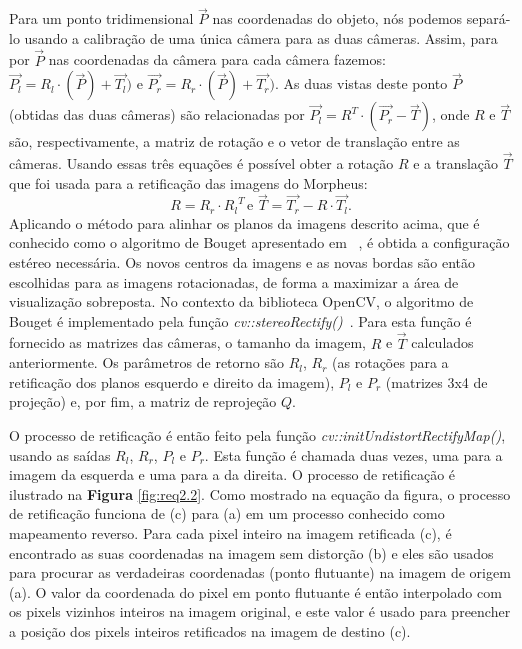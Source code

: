\documentclass{bmvc2k}
\begin{document}
Para um ponto tridimensional $\overrightarrow{P}$ nas coordenadas do objeto, nós podemos separá-lo usando a calibração de uma única câmera para as duas câmeras. Assim, para por $\overrightarrow{P}$ nas coordenadas da câmera para cada câmera fazemos: $\overrightarrow{P_l} = {R_l} \cdot (\overrightarrow{P}) + \overrightarrow{T_l})$ e $\overrightarrow{P_r} = {R_r} \cdot (\overrightarrow{P}) + \overrightarrow{T_r})$.
As duas vistas deste ponto $\overrightarrow{P}$ (obtidas das duas câmeras) são relacionadas por $\overrightarrow{P_l} = {R^T} \cdot (\overrightarrow{P_r} - \overrightarrow{T} )$, onde $R$ e $\overrightarrow{T}$ são, respectivamente, a matriz de rotação e o vetor de translação entre as câmeras. Usando essas três equações é possível obter a rotação $R$ e a translação $\overrightarrow{T}$ que foi usada para a retificação das imagens do Morpheus: $$R = R_r \cdot {R_l}^T \, \mbox{e } \overrightarrow{T} = \overrightarrow{T_r} - R \cdot \overrightarrow{T_l}.$$
Aplicando o método para alinhar os planos da imagens descrito acima, que é conhecido como o algoritmo de Bouget apresentado em ~\cite{kaehler2016learning}, é obtida a configuração estéreo necessária. Os novos centros da imagens e as novas bordas são então escolhidas para as imagens rotacionadas, de forma a maximizar a área de visualização sobreposta. No contexto da biblioteca OpenCV, o algoritmo de Bouget é implementado pela função \textit{cv::stereoRectify()}~\cite{opencvmanual}. Para esta função é fornecido as matrizes das câmeras, o tamanho da imagem, $R$ e $\overrightarrow{T}$ calculados anteriormente. Os parâmetros de retorno são $R_l$, $R_r$ (as rotações para a retificação dos planos esquerdo e direito da imagem), $P_l$ e $P_r$ (matrizes 3x4 de projeção) e, por fim, a matriz de reprojeção $Q$.

O processo de retificação é então feito pela função \textit{cv::initUndistortRectifyMap()}, usando as saídas $R_l$, $R_r$, $P_l$ e $P_r$. Esta função é chamada duas vezes, uma para a imagem da esquerda e uma para a da direita. O processo de retificação é ilustrado na \textbf{Figura} \ref{fig:req2.2}. Como mostrado na equação da figura, o processo de retificação funciona de (c) para (a) em um processo conhecido como mapeamento reverso. Para cada pixel inteiro na imagem retificada (c), é encontrado as suas coordenadas na imagem sem distorção (b) e eles são usados para procurar as verdadeiras coordenadas (ponto flutuante) na imagem de origem (a). O valor da coordenada do pixel em ponto flutuante é então interpolado com os pixels vizinhos inteiros na imagem original, e este valor é usado para preencher a posição dos pixels inteiros retificados na imagem de destino (c).
\end{document}
